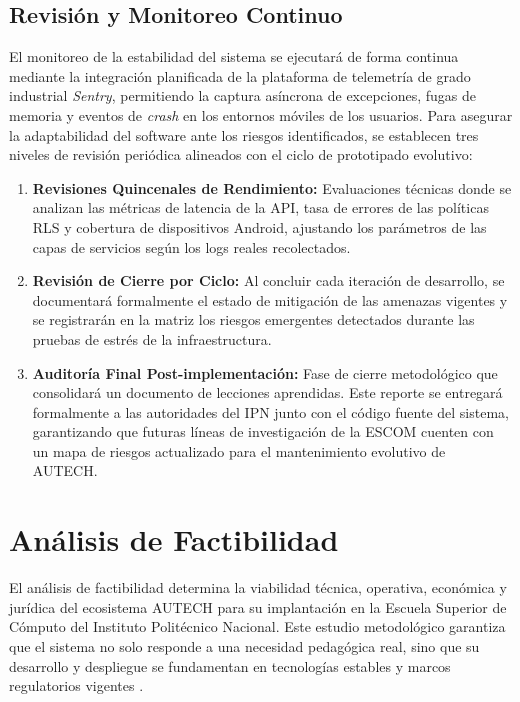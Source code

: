 \subsection{Revisión y Monitoreo Continuo}
\label{subsec:revision_monitoreo}

El monitoreo de la estabilidad del sistema se ejecutará de forma continua mediante la integración planificada de la plataforma de telemetría de grado industrial \textit{Sentry}, permitiendo la captura asíncrona de excepciones, fugas de memoria y eventos de \textit{crash} en los entornos móviles de los usuarios. Para asegurar la adaptabilidad del software ante los riesgos identificados, se establecen tres niveles de revisión periódica alineados con el ciclo de prototipado evolutivo:

\begin{enumerate}
    \item \textbf{Revisiones Quincenales de Rendimiento:} Evaluaciones técnicas donde se analizan las métricas de latencia de la API, tasa de errores de las políticas RLS y cobertura de dispositivos Android, ajustando los parámetros de las capas de servicios según los logs reales recolectados.
    \item \textbf{Revisión de Cierre por Ciclo:} Al concluir cada iteración de desarrollo, se documentará formalmente el estado de mitigación de las amenazas vigentes y se registrarán en la matriz los riesgos emergentes detectados durante las pruebas de estrés de la infraestructura.
    \item \textbf{Auditoría Final Post-implementación:} Fase de cierre metodológico que consolidará un documento de lecciones aprendidas. Este reporte se entregará formalmente a las autoridades del IPN junto con el código fuente del sistema, garantizando que futuras líneas de investigación de la ESCOM cuenten con un mapa de riesgos actualizado para el mantenimiento evolutivo de AUTECH.
\end{enumerate}

\section{Análisis de Factibilidad}
\label{sec:analisis_factibilidad}

El análisis de factibilidad determina la viabilidad técnica, operativa, económica y jurídica del ecosistema AUTECH para su implantación en la Escuela Superior de Cómputo del Instituto Politécnico Nacional. Este estudio metodológico garantiza que el sistema no solo responde a una necesidad pedagógica real, sino que su desarrollo y despliegue se fundamentan en tecnologías estables y marcos regulatorios vigentes \cite{pressman2020}.

